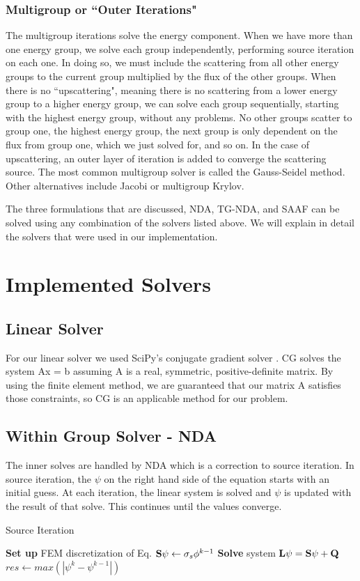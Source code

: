 \subsubsection{Multigroup or ``Outer Iterations"}
The multigroup iterations solve the energy component. When we have more than one energy group, we solve each group independently, performing source iteration on each one. In doing so, we must include the scattering from all other energy groups to the current group multiplied by the flux of the other groups. When there is no ``upscattering", meaning there is no scattering from a lower energy group to a higher energy group, we can solve each group sequentially, starting with the highest energy group, without any problems. No other groups scatter to group one, the highest energy group, the next group is only dependent on the flux from group one, which we just solved for, and so on. In the case of upscattering, an outer layer of iteration is added to converge the scattering source. The most common multigroup solver is called the Gauss-Seidel method. Other alternatives include Jacobi or multigroup Krylov. 

The three formulations that are discussed, NDA, TG-NDA, and SAAF can be solved using any combination of the solvers listed above. We will explain in detail the solvers that were used in our implementation. 

\section{Implemented Solvers}
\subsection{Linear Solver}
For our linear solver we used SciPy's conjugate gradient solver \cite{SciPy} \cite{Shewchuck1994}. CG solves the system Ax = b assuming A is a real, symmetric, positive-definite matrix. By using the finite element method, we are guaranteed that our matrix A satisfies those constraints, so CG is an applicable method for our problem.

\subsection{Within Group Solver - NDA}
The inner solves are handled by NDA which is a correction to source iteration. In source iteration, the $\psi$ on the right hand side of the equation starts with an initial guess. At each iteration, the linear system is solved and $\psi$ is updated with the result of that solve. This continues until the values converge. 
\begin{algorithm}
\caption{Source Iteration}
\begin{algorithmic}
 
    \State \textbf{Set up} FEM discretization of Eq.
    \State ${\bf S} \psi \gets \sigma_s \phi^{k-1}$ 
    \State \textbf{Solve} system $\textbf{L}\psi= {\bf S}\psi + {\bf Q}$
    \State $res \gets max(|\psi^{k} - \psi^{k-1}|)$
\EndWhile
\end{algorithmic}
\end{algorithm}

